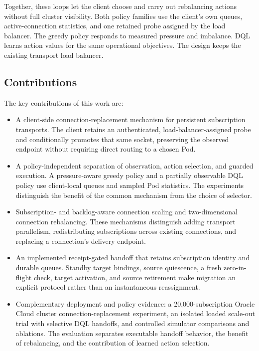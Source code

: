 \documentclass[manuscript,nonacm]{acmart}
\begin{document}
Together, these loops let the client choose and carry out rebalancing actions without full cluster visibility. Both policy families use the client's own queues, active-connection statistics, and one retained probe assigned by the load balancer. The greedy policy responds to measured pressure and imbalance. DQL learns action values for the same operational objectives. The design keeps the existing transport load balancer.

\subsection*{Contributions}

The key contributions of this work are:

\begin{itemize}
	\item A client-side connection-replacement mechanism for persistent subscription transports. The client retains an authenticated, load-balancer-assigned probe and conditionally promotes that same socket, preserving the observed endpoint without requiring direct routing to a chosen Pod.
	
	\item A policy-independent separation of observation, action selection, and guarded execution. A pressure-aware greedy policy and a partially observable DQL policy use client-local queues and sampled Pod statistics. The experiments distinguish the benefit of the common mechanism from the choice of selector.
	
	\item Subscription- and backlog-aware connection scaling and two-dimensional connection rebalancing. These mechanisms distinguish adding transport parallelism, redistributing subscriptions across existing connections, and replacing a connection's delivery endpoint.
	
	\item An implemented receipt-gated handoff that retains subscription identity and durable queues. Standby target bindings, source quiescence, a fresh zero-in-flight check, target activation, and source retirement make migration an explicit protocol rather than an instantaneous reassignment.
	
	\item Complementary deployment and policy evidence: a 20,000-subscription Oracle Cloud cluster connection-replacement experiment, an isolated loaded scale-out trial with selective DQL handoffs, and controlled simulator comparisons and ablations. The evaluation separates executable handoff behavior, the benefit of rebalancing, and the contribution of learned action selection.
\end{itemize}
\end{document}
